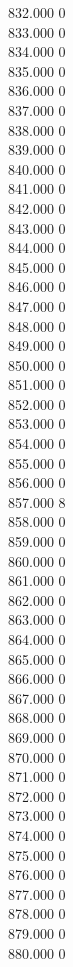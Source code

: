 { 832.000	0 \\
 833.000	0 \\
 834.000	0 \\
 835.000	0 \\
 836.000	0 \\
 837.000	0 \\
 838.000	0 \\
 839.000	0 \\
 840.000	0 \\
 841.000	0 \\
 842.000	0 \\
 843.000	0 \\
 844.000	0 \\
 845.000	0 \\
 846.000	0 \\
 847.000	0 \\
 848.000	0 \\
 849.000	0 \\
 850.000	0 \\
 851.000	0 \\
 852.000	0 \\
 853.000	0 \\
 854.000	0 \\
 855.000	0 \\
 856.000	0 \\
 857.000	8 \\
 858.000	0 \\
 859.000	0 \\
 860.000	0 \\
 861.000	0 \\
 862.000	0 \\
 863.000	0 \\
 864.000	0 \\
 865.000	0 \\
 866.000	0 \\
 867.000	0 \\
 868.000	0 \\
 869.000	0 \\
 870.000	0 \\
 871.000	0 \\
 872.000	0 \\
 873.000	0 \\
 874.000	0 \\
 875.000	0 \\
 876.000	0 \\
 877.000	0 \\
 878.000	0 \\
 879.000	0 \\
 880.000	0 \\
}
